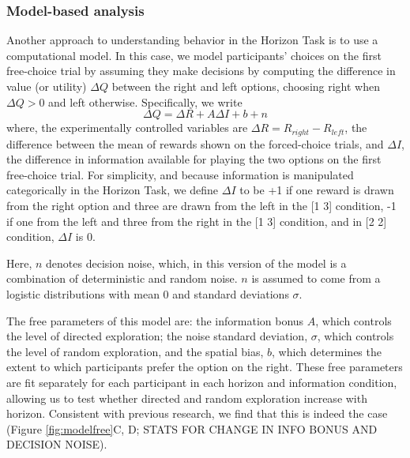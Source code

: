 \documentclass[12pt]{article}
\begin{document}
{	\subsubsection*{Model-based analysis}	
	Another approach to understanding behavior in the Horizon Task is to use a computational model. In this case, we model  participants' choices on the first free-choice trial by assuming they make decisions by computing the difference in value (or utility) $\Delta Q$ between the right and left options, choosing right when $\Delta Q > 0$ and left otherwise.  Specifically, we write
	\begin{equation}
		\label{eq:origmodel}
		\Delta Q= \Delta R+A \Delta I+b+n
	\end{equation}
	where, the experimentally controlled variables are $\Delta R=R_{right}-R_{left}$, the difference between the mean of rewards shown on the forced-choice trials, and $\Delta I$, the difference in information available for playing the two options on the first free-choice trial. For simplicity, and because information is manipulated categorically in the Horizon Task, we define $\Delta I$ to be +1 if one reward is drawn from the right option and three are drawn from the left in the [1 3] condition, -1 if one from the left and three from the right in the [1 3] condition, and in [2 2] condition, $\Delta I$ is 0. 
	
	Here, $n$ denotes decision noise, which, in this version of the model is a combination of deterministic and random noise. $n$ is assumed to come from a logistic distributions with mean 0 and standard deviations $\sigma$.
	
	The free parameters of this model are: the information bonus $A$, which controls the level of directed exploration; the noise standard deviation, $\sigma$, which controls the level of random exploration, and the spatial bias, $b$, which determines the extent to which participants prefer the option on the right. These free parameters are fit separately for each participant in each horizon and information condition, allowing us to test whether directed and random exploration increase with horizon. Consistent with previous research, we find that this is indeed the case (Figure \ref{fig:modelfree}C, D; STATS FOR CHANGE IN INFO BONUS AND DECISION NOISE). 
	 
	
	
}
\end{document}
